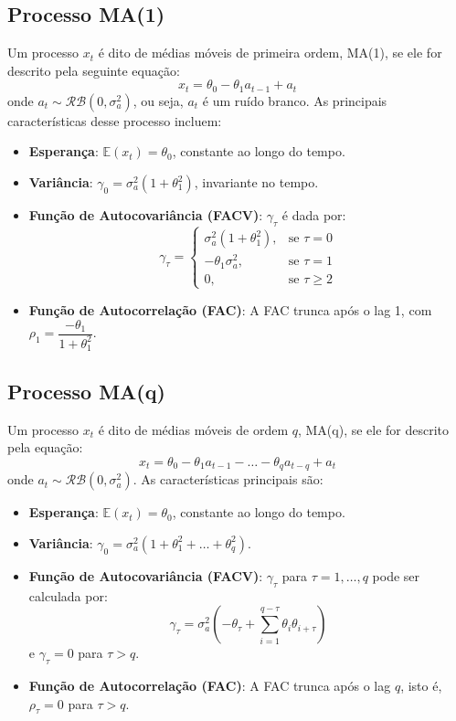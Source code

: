 \documentclass{sciposter}
\begin{document}
\begin{multicols}{3}
\subsection{Processo MA(1)}
Um processo $x_t$ é dito de médias móveis de primeira ordem, MA(1), se ele for descrito pela seguinte equação:
\[
x_t = \theta_0 - \theta_1 a_{t-1} + a_t
\]
onde $a_t \sim \mathcal{RB}(0, \sigma_a^2)$, ou seja, $a_t$ é um ruído branco. As principais características desse processo incluem:
\begin{itemize}
    \item \textbf{Esperança}: $\mathbb{E}(x_t) = \theta_0$, constante ao longo do tempo.
    \item \textbf{Variância}: $\gamma_0 = \sigma_a^2(1 + \theta_1^2)$, invariante no tempo.
    \item \textbf{Função de Autocovariância (FACV)}: $\gamma_\tau$ é dada por:
    \[
    \gamma_\tau =
    \begin{cases}
        \sigma_a^2(1 + \theta_1^2), & \text{se } \tau = 0 \\
        -\theta_1 \sigma_a^2, & \text{se } \tau = 1 \\
        0, & \text{se } \tau \geq 2
    \end{cases}
    \]
    \item \textbf{Função de Autocorrelação (FAC)}: A FAC trunca após o lag 1, com $\rho_1 = \dfrac{-\theta_1}{1 + \theta_1^2}$.
\end{itemize}

\subsection{Processo MA(q)}
Um processo $x_t$ é dito de médias móveis de ordem $q$, MA(q), se ele for descrito pela equação:
\[
x_t = \theta_0 - \theta_1 a_{t-1} - \dots - \theta_q a_{t-q} + a_t
\]
onde $a_t \sim \mathcal{RB}(0, \sigma_a^2)$. As características principais são:
\begin{itemize}
    \item \textbf{Esperança}: $\mathbb{E}(x_t) = \theta_0$, constante ao longo do tempo.
    \item \textbf{Variância}: $\gamma_0 = \sigma_a^2(1 + \theta_1^2 + \dots + \theta_q^2)$.
    \item \textbf{Função de Autocovariância (FACV)}: $\gamma_\tau$ para $\tau = 1, \dots, q$ pode ser calculada por:
    \[
    \gamma_\tau = \sigma_a^2 \left(-\theta_\tau + \sum_{i=1}^{q-\tau} \theta_i \theta_{i+\tau} \right)
    \]
    e $\gamma_\tau = 0$ para $\tau > q$.
    \item \textbf{Função de Autocorrelação (FAC)}: A FAC trunca após o lag $q$, isto é, $\rho_\tau = 0$ para $\tau > q$.
\end{itemize}


\end{multicols}
\end{document}
